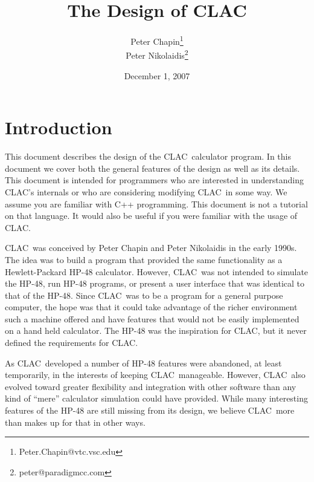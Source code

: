 \documentclass{report}
\newcommand{\CLAC}{CLAC}
\begin{document}
\title{The Design of CLAC}
\author{Peter Chapin\thanks{Peter.Chapin@vtc.vsc.edu}\\
        Peter Nikolaidis\thanks{peter@paradigmcc.com}}
\date{December 1, 2007}
\maketitle

\tableofcontents
\newpage
{}

\chapter{Introduction}

This document describes the design of the \CLAC\ calculator program. In this document we cover both the general features of the design as well as its details. This document is intended for programmers who are interested in understanding \CLAC's internals or who are considering modifying \CLAC\ in some way. We assume you are familiar with C++ programming. This document is not a tutorial on that language. It would also be useful if you were familiar with the usage of \CLAC.

\CLAC\ was conceived by Peter Chapin and Peter Nikolaidis in the early 1990s. The idea was to build a program that provided the same functionality as a Hewlett-Packard HP-48 calculator. However, \CLAC\ was not intended to simulate the HP-48, run HP-48 programs, or present a user interface that was identical to that of the HP-48. Since \CLAC\ was to be a program for a general purpose computer, the hope was that it could take advantage of the richer environment such a machine offered and have features that would not be easily implemented on a hand held calculator. The HP-48 was the inspiration for \CLAC, but it never defined the requirements for \CLAC.

As \CLAC\ developed a number of HP-48 features were abandoned, at least temporarily, in the interests of keeping \CLAC\ manageable. However, \CLAC\ also evolved toward greater flexibility and integration with other software than any kind of ``mere'' calculator simulation could have provided. While many interesting features of the HP-48 are still missing from its design, we believe \CLAC\ more than makes up for that in other ways.
\end{document}
